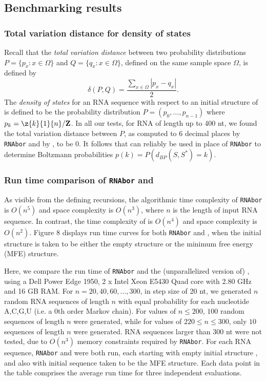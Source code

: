 \subsection*{Benchmarking results}

\subsubsection*{Total variation distance for density of states}

Recall that the {\em total variation distance}
between two probability distributions
$P = \{ p_{x} : x \in \Omega\}$ and
$Q = \{ q_{x} : x \in \Omega\}$, defined on the same sample space $\Omega$, is
defined by
\[
\delta(P,Q) = \frac{\sum_{x \in \Omega} |p_x - q_x|}{2}.
\]
The {\em density of states} for an RNA sequence \seq with respect to
an initial structure \strSt of \seq is defined to be the probability
distribution
$P = (p_0,\ldots,p_{n-1})$ where $p_k = \z{k}{1}{n}/{\bf Z}$.
In all our tests, for RNA of length up to 400 nt, we found the total
variation distance between $P$, as computed to 6 decimal places by
{\tt RNAbor} and by \fftbor, to be $0$. It follows that \fftbor
can reliably be used in place of {\tt RNAbor} to determine Boltzmann
probabilities $p(k) = P\left( d_{BP}(S,S^*)=k \right)$.

\subsubsection*{Run time comparison of {\tt RNAbor} and \fftbor}

As visible from the defining recursions, the algorithmic time complexity of
{\tt RNAbor} is $O(n^5)$ and space complexity is $O(n^3)$, where $n$ is
the length of input RNA sequence. In contrast, the time complexity of
\fftbor is $O(n^4)$ and space complexity is $O(n^2)$.
Figure 8 displays run time curves for both
{\tt RNAbor} and \fftbor, when the initial structure \strSt is
taken to be either the empty structure or the minimum free energy
(MFE) structure.

Here, we compare the run time of {\tt RNAbor} \cite{Freyhult.b07} and
the (unparallelized version of) \fftbor, using
a Dell Power Edge 1950, 2 x Intel Xeon E5430 Quad
core with 2.80 GHz and 16 GB RAM. For $n = 20,40,60,\ldots, 300$, in step
size of 20 nt, we generated $n$ random RNA sequences of length $n$ with equal
probability for each nucleotide A,C,G,U (i.e. a $0$th order Markov chain).
For values of $n \leq 200$, $100$ random sequences of length
$n$ were generated, while for values of $220 \leq n \leq 300$, only
$10$ sequences of length $n$ were generated.
RNA sequences larger than 300 nt were not tested,
due to $O(n^3)$ memory constraints required by {\tt RNAbor}.
For each RNA sequence, {\tt RNAbor} and \fftbor were both run,
each starting with empty initial structure \strSt, and also
with initial sequence \strSt taken to be the MFE structure.
Each data point in the table comprises the average run time for three
independent evaluations.

